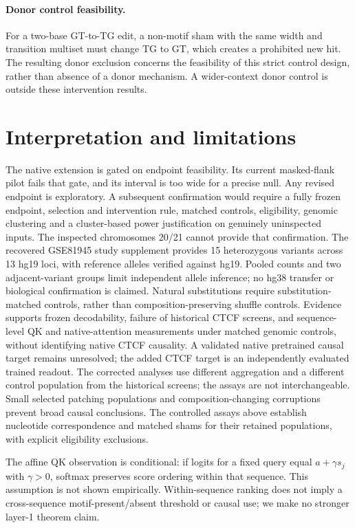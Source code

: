 \paragraph{Donor control feasibility.}
For a two-base GT-to-TG edit, a non-motif sham with the same width and transition multiset must change TG to GT, which creates a prohibited new hit. The resulting donor exclusion concerns the feasibility of this strict control design, rather than absence of a donor mechanism. A wider-context donor control is outside these intervention results.
\FloatBarrier
\section{Interpretation and limitations}
The native extension is gated on endpoint feasibility. Its current masked-flank pilot fails that gate, and its interval is too wide for a precise null. Any revised endpoint is exploratory. A subsequent confirmation would require a fully frozen endpoint, selection and intervention rule, matched controls, eligibility, genomic clustering and a cluster-based power justification on genuinely uninspected inputs. The inspected chromosomes 20/21 cannot provide that confirmation. The recovered GSE81945 study supplement provides 15 heterozygous variants across 13 hg19 loci, with reference alleles verified against hg19. Pooled counts and two adjacent-variant groups limit independent allele inference; no hg38 transfer or biological confirmation is claimed. Natural substitutions require substitution-matched controls, rather than composition-preserving shuffle controls.
Evidence supports frozen decodability, failure of historical CTCF screens, and sequence-level QK and native-attention measurements under matched genomic controls, without identifying native CTCF causality. A validated native pretrained causal target remains unresolved; the added CTCF target is an independently evaluated trained readout. The corrected analyses use different aggregation and a different control population from the historical screens; the assays are not interchangeable. Small selected patching populations and composition-changing corruptions prevent broad causal conclusions. The controlled assays above establish nucleotide correspondence and matched shams for their retained populations, with explicit eligibility exclusions.

The affine QK observation is conditional: if logits for a fixed query equal $a+\gamma s_j$ with $\gamma>0$, softmax preserves score ordering within that sequence. This assumption is not shown empirically. Within-sequence ranking does not imply a cross-sequence motif-present/absent threshold or causal use; we make no stronger layer-1 theorem claim.

